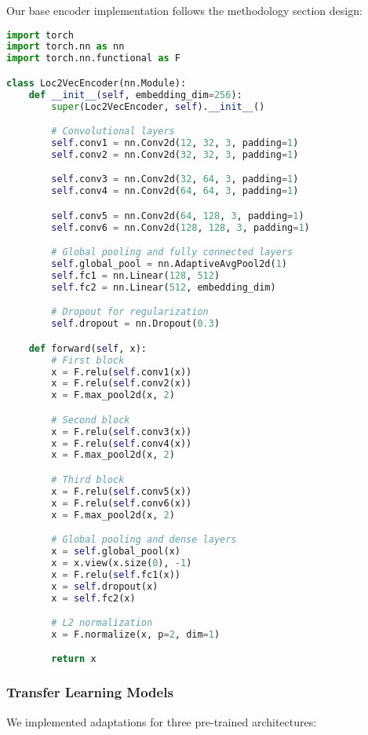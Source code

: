 Our base encoder implementation follows the methodology section design:

\begin{lstlisting}[language=Python, caption=Base CNN Encoder]
import torch
import torch.nn as nn
import torch.nn.functional as F

class Loc2VecEncoder(nn.Module):
    def __init__(self, embedding_dim=256):
        super(Loc2VecEncoder, self).__init__()

        # Convolutional layers
        self.conv1 = nn.Conv2d(12, 32, 3, padding=1)
        self.conv2 = nn.Conv2d(32, 32, 3, padding=1)

        self.conv3 = nn.Conv2d(32, 64, 3, padding=1)
        self.conv4 = nn.Conv2d(64, 64, 3, padding=1)

        self.conv5 = nn.Conv2d(64, 128, 3, padding=1)
        self.conv6 = nn.Conv2d(128, 128, 3, padding=1)

        # Global pooling and fully connected layers
        self.global_pool = nn.AdaptiveAvgPool2d(1)
        self.fc1 = nn.Linear(128, 512)
        self.fc2 = nn.Linear(512, embedding_dim)

        # Dropout for regularization
        self.dropout = nn.Dropout(0.3)

    def forward(self, x):
        # First block
        x = F.relu(self.conv1(x))
        x = F.relu(self.conv2(x))
        x = F.max_pool2d(x, 2)

        # Second block
        x = F.relu(self.conv3(x))
        x = F.relu(self.conv4(x))
        x = F.max_pool2d(x, 2)

        # Third block
        x = F.relu(self.conv5(x))
        x = F.relu(self.conv6(x))
        x = F.max_pool2d(x, 2)

        # Global pooling and dense layers
        x = self.global_pool(x)
        x = x.view(x.size(0), -1)
        x = F.relu(self.fc1(x))
        x = self.dropout(x)
        x = self.fc2(x)

        # L2 normalization
        x = F.normalize(x, p=2, dim=1)

        return x
\end{lstlisting}

\subsubsection{Transfer Learning Models}

We implemented adaptations for three pre-trained architectures:

